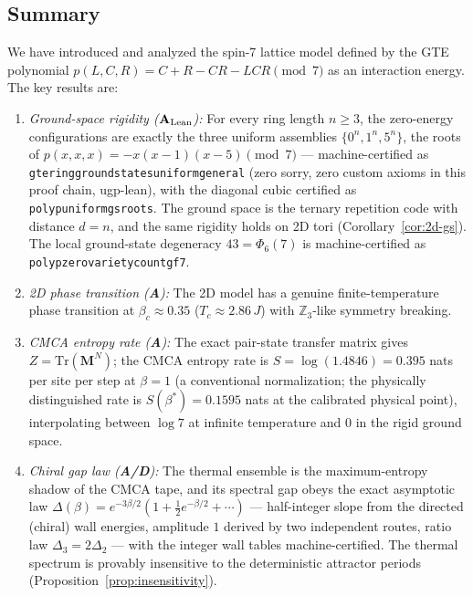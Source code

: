 \documentclass[11pt]{article}
\theoremstyle{remark}
\newcommand{\lean}[1]{%
  \penalty-100
  \begingroup\def\_{\textunderscore\allowbreak}\texttt{#1}\endgroup}
\newcommand{\CatA}{\textbf{A}}
\newcommand{\CatAL}{\ensuremath{\textbf{A}_{\rm Lean}}}
\newcommand{\CatAD}{\textbf{A/D}}
\begin{document}
\subsection{Summary}

We have introduced and analyzed the spin-7 lattice model defined by the GTE polynomial
$p(L,C,R) = C+R-CR-LCR \pmod 7$ as an interaction energy. The key results are:

\begin{enumerate}[leftmargin=2em,itemsep=3pt]
  \item \emph{Ground-space rigidity (\CatAL{}):} For every ring length $n \ge 3$,
    the zero-energy configurations are exactly the three uniform assemblies
    $\{0^n, 1^n, 5^n\}$, the roots of $p(x,x,x) = -x(x-1)(x-5) \pmod 7$ ---
    machine-certified as \lean{gte\_ring\_ground\_states\_uniform\_general}
    (zero sorry, zero custom axioms in this proof chain, ugp-lean), with the diagonal cubic
    certified as \lean{poly\_p\_uniform\_gs\_roots}. The ground space is the
    ternary repetition code with distance $d = n$, and the same rigidity holds
    on 2D tori (Corollary~\ref{cor:2d-gs}). The local ground-state degeneracy
    $43 = \Phi_6(7)$ is machine-certified as
    \lean{poly\_p\_zero\_variety\_count\_gf7}.
  \item \emph{2D phase transition (\CatA{}):} The 2D model has a genuine finite-temperature
    phase transition at $\beta_c \approx 0.35$ ($T_c \approx 2.86\,J$) with $\mathbb{Z}_3$-like
    symmetry breaking.
  \item \emph{CMCA entropy rate (\CatA{}):} The exact pair-state transfer matrix
    gives $Z = \mathrm{Tr}(\mathbf{M}^N)$; the CMCA entropy rate is
    $S = \log(1.4846) = 0.395$ nats per site per step at $\beta = 1$ (a
    conventional normalization; the physically distinguished rate is
    $S(\beta^*) = 0.1595$ nats at the calibrated physical point),
    interpolating between $\log 7$ at infinite temperature and $0$ in the rigid
    ground space.
  \item \emph{Chiral gap law (\CatAD{}):} The thermal ensemble is the
    maximum-entropy shadow of the CMCA tape, and its spectral gap obeys the
    exact asymptotic law $\Delta(\beta) = e^{-3\beta/2}(1 +
    \tfrac{1}{2}e^{-\beta/2} + \cdots)$ --- half-integer slope from the
    directed (chiral) wall energies, amplitude $1$ derived by two independent
    routes, ratio law $\Delta_3 = 2\Delta_2$ --- with the integer wall tables
    machine-certified. The thermal spectrum is provably insensitive to the
    deterministic attractor periods (Proposition~\ref{prop:insensitivity}).

\end{enumerate}
\end{document}
